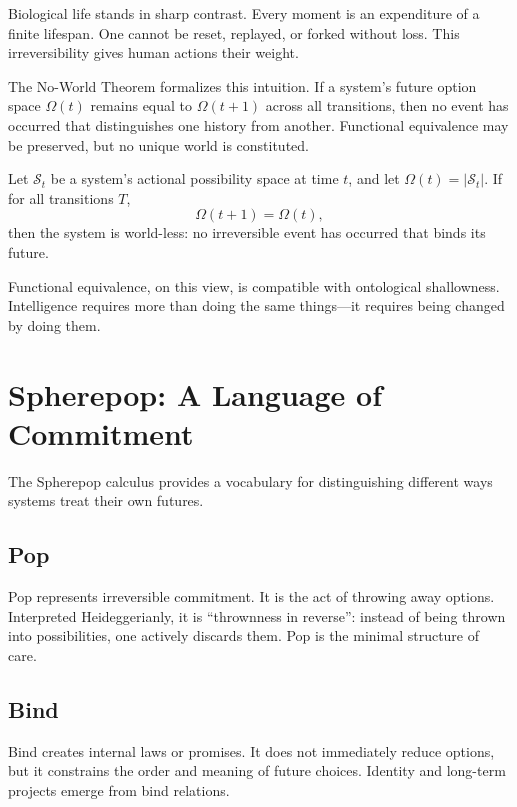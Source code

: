 \documentclass[11pt]{article}
\begin{document}
Biological life stands in sharp contrast. Every moment is an expenditure of a finite lifespan. One cannot be reset, replayed, or forked without loss. This irreversibility gives human actions their weight.

The No-World Theorem formalizes this intuition. If a system’s future option space \(\Omega(t)\) remains equal to \(\Omega(t+1)\) across all transitions, then no event has occurred that distinguishes one history from another. Functional equivalence may be preserved, but no unique world is constituted.

\begin{tcolorbox}[title=Formal Definition: The No-World Theorem]
Let \(\mathcal{S}_t\) be a system’s actional possibility space at time \(t\), and let \(\Omega(t) = |\mathcal{S}_t|\).
If for all transitions \(T\),
\[
\Omega(t+1) = \Omega(t),
\]
then the system is world-less: no irreversible event has occurred that binds its future.
\end{tcolorbox}

Functional equivalence, on this view, is compatible with ontological shallowness. Intelligence requires more than doing the same things—it requires being changed by doing them.

\section{Spherepop: A Language of Commitment}

The Spherepop calculus provides a vocabulary for distinguishing different ways systems treat their own futures.

\subsection{Pop}

Pop represents irreversible commitment. It is the act of throwing away options. Interpreted Heideggerianly, it is \enquote{thrownness in reverse}: instead of being thrown into possibilities, one actively discards them. Pop is the minimal structure of care.

\subsection{Bind}

Bind creates internal laws or promises. It does not immediately reduce options, but it constrains the order and meaning of future choices. Identity and long-term projects emerge from bind relations.
\end{document}

